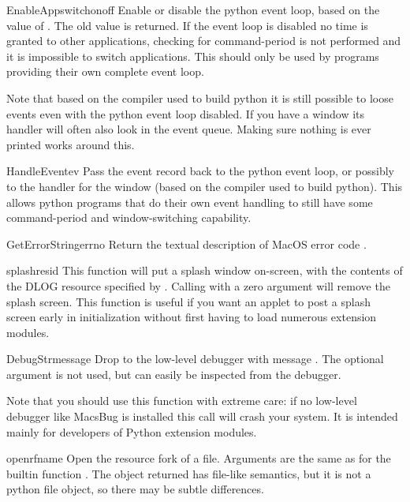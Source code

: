 \begin{funcdesc}{EnableAppswitch}{onoff}
Enable or disable the python event loop, based on the value of
. The old value is returned. If the event loop is disabled
no time is granted to other applications, checking for command-period
is not performed and it is impossible to switch applications. This
should only be used by programs providing their own complete event
loop.

Note that based on the compiler used to build python it is still
possible to loose events even with the python event loop disabled. If
you have a  window its handler will often also look
in the event queue. Making sure nothing is ever printed works around
this.
\end{funcdesc}

\begin{funcdesc}{HandleEvent}{ev}
Pass the event record  back to the python event loop, or
possibly to the handler for the  window (based on the
compiler used to build python). This allows python programs that do
their own event handling to still have some command-period and
window-switching capability.
\end{funcdesc}

\begin{funcdesc}{GetErrorString}{errno}
Return the textual description of MacOS error code .
\end{funcdesc}

\begin{funcdesc}{splash}{resid}
This function will put a splash window
on-screen, with the contents of the DLOG resource specified by
. Calling with a zero argument will remove the splash
screen. This function is useful if you want an applet to post a splash screen
early in initialization without first having to load numerous
extension modules.
\end{funcdesc}

\begin{funcdesc}{DebugStr}{message }
Drop to the low-level debugger with message . The
optional  argument is not used, but can easily be
inspected from the debugger.

Note that you should use this function with extreme care: if no
low-level debugger like MacsBug is installed this call will crash your
system. It is intended mainly for developers of Python extension
modules.
\end{funcdesc}

\begin{funcdesc}{openrf}{name }
Open the resource fork of a file. Arguments are the same as for the
builtin function . The object returned has file-like
semantics, but it is not a python file object, so there may be subtle
differences.
\end{funcdesc}
